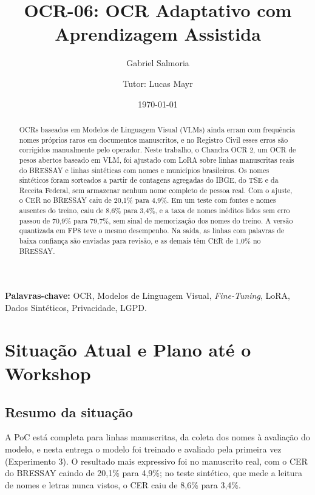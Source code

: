 \documentclass[12pt,a4paper]{article}
\title{\textbf{OCR-06: OCR Adaptativo com Aprendizagem Assistida}}
\author{Gabriel Salmoria \and Tutor: Lucas Mayr}
\date{\small \today}
\begin{document}
\maketitle

\begin{abstract}
OCRs baseados em Modelos de Linguagem Visual (VLMs) ainda erram com frequência nomes próprios raros em documentos manuscritos, e no Registro Civil esses erros são corrigidos manualmente pelo operador. Neste trabalho, o Chandra OCR 2, um OCR de pesos abertos baseado em VLM, foi ajustado com LoRA sobre linhas manuscritas reais do BRESSAY e linhas sintéticas com nomes e municípios brasileiros. Os nomes sintéticos foram sorteados a partir de contagens agregadas do IBGE, do TSE e da Receita Federal, sem armazenar nenhum nome completo de pessoa real. Com o ajuste, o CER no BRESSAY caiu de 20,1\% para 4,9\%. Em um teste com fontes e nomes ausentes do treino, caiu de 8,6\% para 3,4\%, e a taxa de nomes inéditos lidos sem erro passou de 70,9\% para 79,7\%, sem sinal de memorização dos nomes do treino. A versão quantizada em FP8 teve o mesmo desempenho. Na saída, as linhas com palavras de baixa confiança são enviadas para revisão, e as demais têm CER de 1,0\% no BRESSAY.
\end{abstract}

\textbf{Palavras-chave:} OCR, Modelos de Linguagem Visual, \emph{Fine-Tuning}, LoRA, Dados Sintéticos, Privacidade, LGPD.

\tableofcontents

\section*{Situação Atual e Plano até o Workshop}
\label{sec:situacao}

\subsection*{Resumo da situação}

A PoC está completa para linhas manuscritas, da coleta dos nomes à avaliação do modelo, e nesta entrega o modelo foi treinado e avaliado pela primeira vez (Experimento 3). O resultado mais expressivo foi no manuscrito real, com o CER do BRESSAY caindo de 20,1\% para 4,9\%; no teste sintético, que mede a leitura de nomes e letras nunca vistos, o CER caiu de 8,6\% para 3,4\%.
\end{document}
